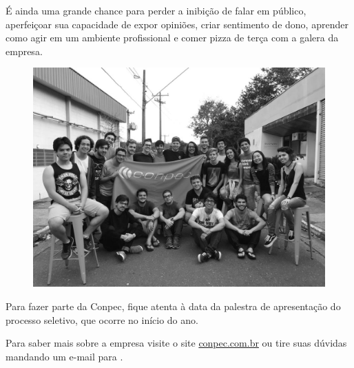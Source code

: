 É ainda uma grande chance para perder a inibição de falar em público,
aperfeiçoar sua capacidade de expor opiniões, criar sentimento de dono, aprender
como agir em um ambiente profissional e comer pizza de terça com a galera da
empresa.

\begin{figure}[H]
  \centering
  \includegraphics[width=.45\textwidth]{img/alem_da_graduacao/conpec_foto.jpg}
\end{figure}

Para fazer parte da Conpec, fique atenta à data da palestra de apresentação do
processo seletivo, que ocorre no início do ano.

Para saber mais sobre a empresa visite o site \url{conpec.com.br} ou tire suas
dúvidas mandando um e-mail para .
